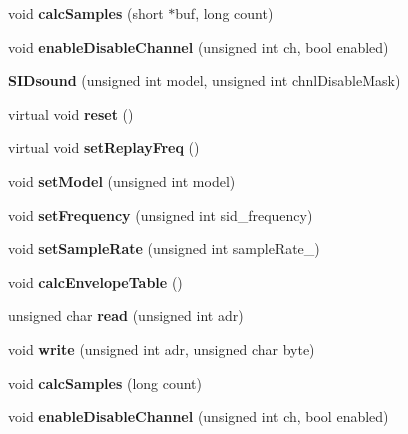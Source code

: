 \begin{DoxyCompactItemize}
\item 
\mbox{\label{class_s_i_dsound_aa00aeb2d68799303b1fe400182132485}} 
void {\bfseries calc\+Samples} (short $\ast$buf, long count)
\item 
\mbox{\label{class_s_i_dsound_ac520bf36fff2a4474e40a4bf2dd08ff2}} 
void {\bfseries enable\+Disable\+Channel} (unsigned int ch, bool enabled)
\item 
\mbox{\label{class_s_i_dsound_af4115d156d31aecdb754464369346827}} 
{\bfseries S\+I\+Dsound} (unsigned int model, unsigned int chnl\+Disable\+Mask)
\item 
\mbox{\label{class_s_i_dsound_a9db37a6abbac43409e24f609f5705540}} 
virtual void {\bfseries reset} ()
\item 
\mbox{\label{class_s_i_dsound_a3cf69222724c4272ba1663d9ea2d78a0}} 
virtual void {\bfseries set\+Replay\+Freq} ()
\item 
\mbox{\label{class_s_i_dsound_a379b984fd04561847c55a689560d4526}} 
void {\bfseries set\+Model} (unsigned int model)
\item 
\mbox{\label{class_s_i_dsound_a920cd2e6ea0d03b6c50830d09f6df5b0}} 
void {\bfseries set\+Frequency} (unsigned int sid\+\_\+frequency)
\item 
\mbox{\label{class_s_i_dsound_a05e4c58e7d217f73b4ef3248f9200632}} 
void {\bfseries set\+Sample\+Rate} (unsigned int sample\+Rate\+\_\+)
\item 
\mbox{\label{class_s_i_dsound_ac0d811046c1e7ca244502320f980a66c}} 
void {\bfseries calc\+Envelope\+Table} ()
\item 
\mbox{\label{class_s_i_dsound_af48fdd685885fdfa5170d9abfe9ed41f}} 
unsigned char {\bfseries read} (unsigned int adr)
\item 
\mbox{\label{class_s_i_dsound_a9fb044dab59b0196f68a987252b71790}} 
void {\bfseries write} (unsigned int adr, unsigned char byte)
\item 
\mbox{\label{class_s_i_dsound_a1ab6b042f7448b9018fb7e996301b663}} 
void {\bfseries calc\+Samples} (long count)
\item 
\mbox{\label{class_s_i_dsound_ac520bf36fff2a4474e40a4bf2dd08ff2}} 
void {\bfseries enable\+Disable\+Channel} (unsigned int ch, bool enabled)
\end{DoxyCompactItemize}


